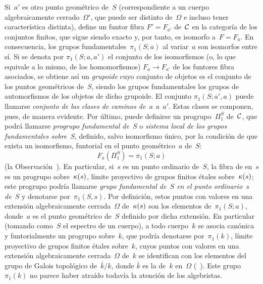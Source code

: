 Si~$a'$ es otro punto geométrico de~$S$ (correspondiente a un cuerpo
algebraicamente cerrado~$\Omega'$, que puede ser distinto de~$\Omega$ e
incluso tener característica distinta), define un funtor fibra
$F'=F_{a'}$ de~$\cal{C}$ en la categoría de los conjuntos finitos, que
sigue siendo exacto y, por tanto, es isomorfo a~$F=F_a$. En consecuencia,
los grupos fundamentales~$\pi_1(S;a)$
\label{indnot:eg1}%
al variar~$a$ son isomorfos entre sí. Si se denota por
$\pi_1(S;a,a')$
\label{indnot:eh}%
el conjunto de los isomorfismos (o, lo que equivale a lo mismo,
de los homomorfismos) $F_a\to F_{a'}$ de los funtores fibra asociados,
se obtiene así un \emph{grupoide} cuyo conjunto de objetos es el conjunto
de los puntos geométricos de~$S$, siendo los grupos fundamentales los
grupos de automorfismos de los objetos de dicho grupoide. El conjunto
$\pi_1(S;a',a)$ puede llamarse \emph{conjunto de las clases de caminos
de~$a$ a~$a'$}. Estas clases se componen, pues, de manera evidente.
Por último, puede definirse un progrupo~$\Pi_1^S$ de~$\cal{C}$, que podrá
llamarse \emph{progrupo fundamental de~$S$}
%
o \emph{sistema local de los grupos fundamentales sobre~$S$},
%
definido, salvo isomorfismo único, por la condición de que exista un
isomorfismo, funtorial en el punto geométrico~$a$ de~$S$:
$$
F_a(\Pi_1^S)=\pi_1(S;a)
$$
(\cf la Observación~). En particular, si~$s$ es un punto
ordinario de~$S$, la fibra de
en~$s$ es un progrupo sobre~$\kres(s)$, límite proyectivo de grupos finitos
étales sobre~$\kres(s)$; este progrupo podría llamarse \emph{grupo
fundamental de~$S$ en el punto ordinario~$s$ de~$S$} y denotarse
por~$\pi_1(S,s)$. Por definición, estos puntos
con valores en una extensión algebraicamente cerrada~$\Omega$
de~$\kres(s)$ son los elementos de~$\pi_1(S;a)$, donde~$a$ es el punto
geométrico de~$S$ definido por dicha extensión. En particular (tomando
como~$S$ el espectro de un cuerpo), a todo cuerpo~$k$ se asocia canónica y
funtorialmente un progrupo sobre~$k$, que podría denotarse por~$\pi_1(k)$,
límite proyectivo de grupos finitos étales sobre~$k$, cuyos puntos con
valores en una extensión algebraicamente cerrada~$\Omega$ de~$k$ se identifican
%
con los elementos del grupo de Galois topológico de~$\bar{k}/k$, donde
$\bar{k}$ es la
de~$k$ en~$\Omega$ (\cf~). Este grupo~$\pi_1(k)$ no parece haber
atraído todavía la atención de los algebristas.

